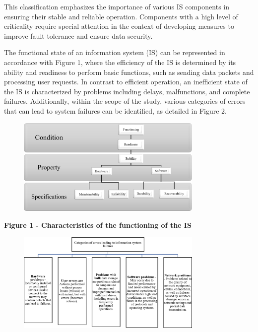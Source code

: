 This classification emphasizes the importance of various IS components
in ensuring their stable and reliable operation. Components with a high
level of criticality require special attention in the context of
developing measures to improve fault tolerance and ensure data security.

The functional state of an information system (IS) can be represented in
accordance with Figure 1, where the efficiency of the IS is determined
by its ability and readiness to perform basic functions, such as sending
data packets and processing user requests. In contrast to efficient
operation, an inefficient state of the IS is characterized by problems
including delays, malfunctions, and complete failures. Additionally,
within the scope of the study, various categories of errors that can
lead to system failures can be identified, as detailed in Figure 2.

\begin{figure}[H]
	\centering
	\includegraphics[width=0.8\textwidth]{assets/43}
	\caption*{}
\end{figure}

\textbf{Figure 1 - Characteristics of the functioning of the IS}

\begin{figure}[H]
	\centering
	\includegraphics[width=0.8\textwidth]{assets/44}
	\caption*{}
\end{figure}

